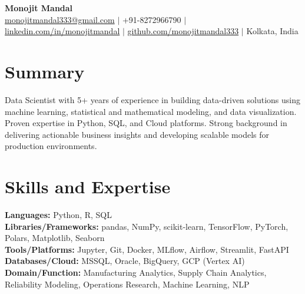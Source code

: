\documentclass[a4paper,10pt]{article}
\begin{document}
\begin{center}
    {\LARGE \textbf{Monojit Mandal}}\\
    \href{mailto:monojitmandal333@gmail.com}{monojitmandal333@gmail.com} $|$ +91-8272966790 $|$ 
    \href{https://www.linkedin.com/in/monojitmandal/}{linkedin.com/in/monojitmandal} $|$ 
    \href{hhttps://github.com/monojitmandal333}{github.com/monojitmandal333} $|$ Kolkata, India
\end{center}

\section*{Summary}
Data Scientist with 5+ years of experience in building data-driven solutions using machine learning, statistical and mathematical modeling, and data visualization. Proven expertise in Python, SQL, and Cloud platforms. Strong background in delivering actionable business insights and developing scalable models for production environments.

\section*{Skills and Expertise}
\textbf{Languages:} Python, R, SQL \\
\textbf{Libraries/Frameworks:} pandas, NumPy, scikit-learn, TensorFlow, PyTorch, Polars, Matplotlib, Seaborn \\
\textbf{Tools/Platforms:} Jupyter, Git, Docker, MLflow, Airflow, Streamlit, FastAPI \\
\textbf{Databases/Cloud:} MSSQL, Oracle, BigQuery, GCP (Vertex AI)\\
\textbf{Domain/Function:} Manufacturing Analytics, Supply Chain Analytics, Reliability Modeling, Operations Research, Machine Learning, NLP

\end{document}
